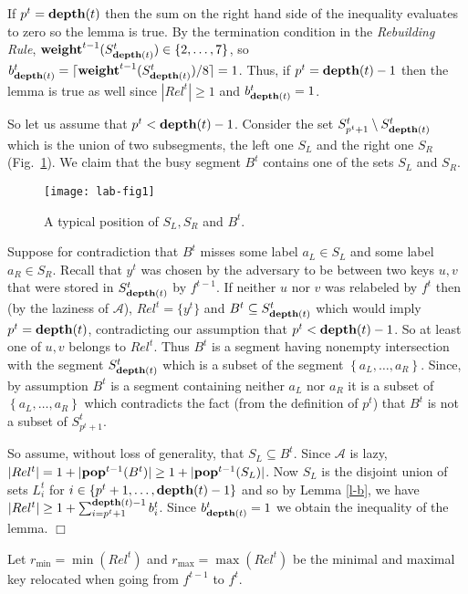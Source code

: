 \documentclass[11pt]{article}
\newcommand{\qed}{$\Box$}
\newenvironment{proof}{\noindent {\bf Proof:}}{\hfill \qed \smallskip}
\newcommand{\A}{\mathcal{A}}
\newcommand{\natInt}[2]{ \left\{ #1, \dotsc, #2 \right\} }
\newcommand{\pop}{{\rm {\bf pop}}}
\newcommand{\weight}{{\rm {\bf weight}}}
\newcommand{\depth}{{\rm {\bf depth}}}
\begin{document}
\begin{proof}
If $p^t = \depth(t)$ then the sum on the right hand side of the inequality evaluates to zero so the lemma is true. 
By the termination condition in the \emph{Rebuilding Rule}, $\weight^{t-1}(S^t_{\depth(t)}) \in \natInt{2}{7}$, so $b^t_{\depth(t)} = \lceil \weight^{t-1}(S^t_{\depth(t)})/8 \rceil = 1$.
Thus, if $p^t = \depth(t)-1$ then the lemma is true as well
since $|Rel^t|\ge 1$ and $b^t_{\depth(t)}=1$. 

So let us assume that $p^t < \depth(t)-1$.
Consider the set $S^t_{p^t+1} \setminus S^t_{\depth(t)}$ which
is the union of two subsegments, the left one $S_L$ and the right one $S_R$ (Fig.~\ref{f-1}).  We claim that the
busy segment $B^t$ contains one of the sets $S_L$ and $S_R$.

\begin{figure}
  \begin{center}
    \texttt{[image: lab-fig1]}
    \caption{A typical position of $S_L,S_R$ and $B^t$.}
    \label{f-1}
  \end{center}
\end{figure}

Suppose for contradiction that $B^t$ misses some label $a_L \in S_L$ and some label $a_R \in S_R$.
Recall that $y^t$ was chosen by the adversary to be between two keys
$u,v$ that were stored  in $S^{t}_{\depth(t)}$ by $f^{t-1}$.
If neither $u$ nor $v$ was relabeled by $f^t$ then (by the laziness of $\A$),
$Rel^t=\{y^t\}$ and $B^t \subseteq S^t_{\depth(t)}$ which would imply $p^t=\depth(t)$,
contradicting our assumption
that $p^t < \depth(t)-1$.  So at least one of $u,v$ belongs to $Rel^t$. Thus
$B^t$ is a segment having nonempty intersection with the segment $S^t_{\depth(t)}$ which is a subset
of the segment $\natInt{a_L}{a_R}$. Since, by assumption $B^t$ is a segment containing neither  $a_L$ nor $a_R$
it is a subset of $\natInt{a_L}{a_R}$ which contradicts the fact (from the definition of $p^t$) 
that $B^t$ is not a subset of $S^t_{p^t+1}$.   

So assume, without loss of generality, that $S_L \subseteq B^t$.
Since $\A$ is lazy, $|Rel^t|=1+|\pop^{t-1}(B^t)| \geq 1+|\pop^{t-1}(S_L)|$.
Now $S_L$ is the disjoint union of sets $L^t_i$ for $i \in \natInt{p^t+1}{\depth(t)-1}$  and so
by Lemma \ref{l-b}, we have $|Rel^t| \geq 1+ \sum_{i=p^t+1}^{\depth(t)-1} b^t_i$.
Since $b^t_{\depth(t)}=1$ we obtain the inequality
of the lemma.
\end{proof}
\iffalse

Let $r_{\mathrm{min}}=\min(Rel^t)$ and $r_{\mathrm{max}}=\max(Rel^t)$ be the minimal and maximal key relocated when going from $f^{t-1}$ to $f^t$.
\end{document}
